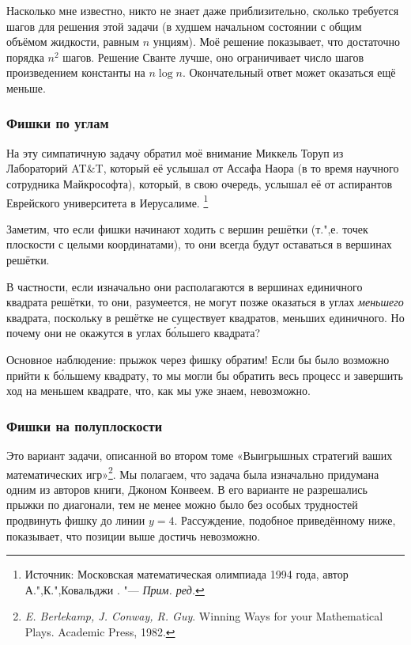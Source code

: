 \documentclass[twoside]{book}
\begin{document}
Насколько мне известно, никто не знает даже приблизительно, сколько требуется шагов для решения этой задачи (в худшем начальном состоянии с общим объёмом жидкости, равным $n$ унциям).
Моё решение показывает, что достаточно порядка $n^2$ шагов.
Решение Сванте лучше, оно ограничивает число шагов произведением константы на $n\log n$.
Окончательный ответ может оказаться ещё меньше.

\subsubsection*{Фишки по углам}%

На эту симпатичную задачу обратил моё внимание Миккель Торуп из Лабораторий AT\&T, %
который её услышал от Ассафа Наора %
(в то время научного сотрудника Майкрософта), который, в свою очередь, услышал её от аспирантов Еврейского университета в Иерусалиме.%
\footnote{Источник: Московская математическая олимпиада 1994 года, автор  А.",К.",Ковальджи \cite[№107751]{problems}. "--- \emph{Прим. ред.}}


\medskip

Заметим, что если фишки начинают ходить с вершин решётки (т.",е. точек плоскости с целыми координатами), то они всегда будут оставаться в вершинах решётки.

В частности, если изначально они располагаются в вершинах единичного квадрата решётки, то они, разумеется, не могут позже оказаться в углах \emph{меньшего} квадрата, поскольку в решётке не существует квадратов, меньших единичного.
Но почему они не окажутся в углах б\'{о}льшего квадрата?

Основное наблюдение: прыжок через фишку обратим!
Если бы было возможно прийти к б\'{о}льшему квадрату, то мы могли бы обратить весь процесс и завершить ход на меньшем квадрате, что, как мы уже знаем, невозможно.
\heart

\subsubsection*{Фишки на полуплоскости}%

Это вариант задачи, описанной во втором томе «Выигрышных стратегий ваших математических игр»\footnote{\emph{E. Berlekamp, J. Conway, R. Guy}.
{Winning Ways for your Mathematical Plays.} Academic Press, 1982.}.
Мы полагаем, что задача была изначально придумана одним из авторов книги, Джоном Конвеем.
В его варианте не разрешались прыжки по диагонали, тем не менее можно было без особых трудностей продвинуть фишку до линии $y = 4$.
Рассуждение, подобное приведённому ниже, показывает, что позиции выше достичь невозможно.
\end{document}
